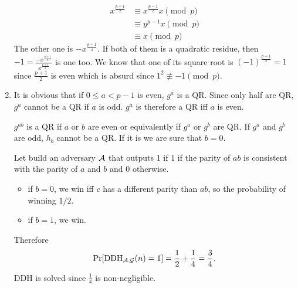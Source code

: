 \begin{solution}
\begin{enumerate}
      \begin{align*}
        x^{\frac{p+1}{2}}
        & \equiv x^{\frac{p-1}{2}}x \pmod{p}\\
        & \equiv y^{p-1}x \pmod{p}\\
        & \equiv x \pmod{p}
      \end{align*}
      The other one is $-x^{\frac{p+1}{4}}$.
      If both of them is a quadratic residue, then $-1 = \frac{-x^{\frac{p+1}{4}}}{x^{\frac{p+1}{4}}}$ is one too.
      We know that one of its square root is $(-1)^{\frac{p+1}{2}} = 1$ since $\frac{p+1}{2}$ is even which is absurd
      since $1^2 \not\equiv -1 \pmod{p}$.
    \item
      It is obvious that if $0 \leq a < p-1$ is even, $g^a$ is a QR.
      Since only half are QR, $g^a$ cannot be a QR if $a$ is odd.
      $g^a$ is therefore a QR iff $a$ is even.

      $g^{ab}$ is a QR if $a$ or $b$ are even or equivalently
      if $g^a$ or $g^b$ are QR.
      If $g^a$ and $g^b$ are odd, $h_b$ cannot be a QR.
      If it is we are sure that $b = 0$.

      Let build an adversary $\mathcal{A}$ that outputs 1 if $1$ if the parity of
      $ab$ is consistent with the parity of $a$ and $b$ and $0$ otherwise.
      \begin{itemize}
        \item if $b = 0$, we win iff $c$ has a different parity than $ab$, so the probability of winning $1/2$.
        \item if $b = 1$, we win.
      \end{itemize}
      Therefore
      \[ \Pr[\operatorname{DDH}_{\mathcal{A},\mathcal{G}}(n) = 1] = \frac{1}{2} + \frac{1}{4} = \frac{3}{4}. \]
      DDH is solved since $\frac{1}{4}$ is non-negligible.
  \end{enumerate}
\end{solution}

